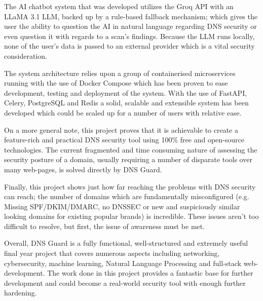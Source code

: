 \documentclass[12pt, a4paper, oneside]{report}
\begin{document}
The AI chatbot system that was developed utilizes the Groq API with an LLaMA 3.1 LLM, backed up by a rule-based fallback mechanism; which gives the user the ability to question the AI in natural language regarding DNS security or even question it with regards to a scan's findings. Because the LLM runs locally, none of the user's data is passed to an external provider which is a vital security consideration.

The system architecture relies upon a group of containerised microservices running with the use of Docker Compose which has been proven to ease development, testing and deployment of the system. With the use of FastAPI, Celery, PostgreSQL and Redis a solid, scalable and extensible system has been developed which could be scaled up for a number of users with relative ease.

On a more general note, this project proves that it is achievable to create a feature-rich and practical DNS security tool using 100\% free and open-source technologies. The current fragmented and time consuming nature of assessing the security posture of a domain, usually requiring a number of disparate tools over many web-pages, is solved directly by DNS Guard.

Finally, this project shows just how far reaching the problems with DNS security can reach; the number of domains which are fundamentally misconfigured (e.g. Missing SPF/DKIM/DMARC, no DNSSEC or new and suspiciously similar looking domains for existing popular brands) is incredible. These issues aren't too difficult to resolve, but first, the issue of awareness must be met.

Overall, DNS Guard is a fully functional, well-structured and extremely useful final year project that covers numerous aspects including networking, cybersecurity, machine learning, Natural Language Processing and full-stack web-development. The work done in this project provides a fantastic base for further development and could become a real-world security tool with enough further hardening.

\printbibliography[heading=bibintoc, title={References}]

\newpage
\appendix
{}

\end{document}
